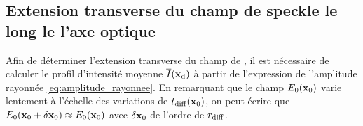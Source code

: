 \subsection{Extension transverse du champ de speckle le long le l'axe optique}

Afin de déterminer l'extension transverse du champ de \speckle , il est nécessaire de calculer le profil d'intensité moyenne $\overline{I}(\mathbf{x}_{\mathrm{d}})$ à partir de l'expression de l'amplitude rayonnée \ref{eq:amplitude_rayonnee}. En remarquant que le champ $E_0(\mathbf{x}_0)$ varie lentement à l'échelle des variations de $t_{\mathrm{diff}}(\mathbf{x}_0)$, on peut écrire que $E_0(\mathbf{x}_0+\delta\mathbf{x}_0)\approx E_0(\mathbf{x}_0)$ avec $\delta\mathbf{x}_0$ de l'ordre de $r_{\mathrm{diff}}$. 

